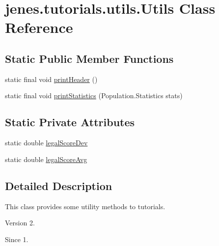 \hypertarget{classjenes_1_1tutorials_1_1utils_1_1_utils}{\section{jenes.\-tutorials.\-utils.\-Utils Class Reference}
\label{classjenes_1_1tutorials_1_1utils_1_1_utils}
}
\subsection*{Static Public Member Functions}
\begin{DoxyCompactItemize}
\item 
static final void \hyperlink{classjenes_1_1tutorials_1_1utils_1_1_utils_a69faf47422bb9677c832496aa7c3b516}{print\-Header} ()
\item 
static final void \hyperlink{classjenes_1_1tutorials_1_1utils_1_1_utils_a6bee3809d14100994dd942f3d745fa0c}{print\-Statistics} (Population.\-Statistics stats)
\end{DoxyCompactItemize}
\subsection*{Static Private Attributes}
\begin{DoxyCompactItemize}
\item 
static double \hyperlink{classjenes_1_1tutorials_1_1utils_1_1_utils_a88c455de5941ab784dee9bef8ee4d46f}{legal\-Score\-Dev}
\item 
static double \hyperlink{classjenes_1_1tutorials_1_1utils_1_1_utils_af0307ceaa2b9ca93fb3cfef7c75303a8}{legal\-Score\-Avg}
\end{DoxyCompactItemize}


\subsection{Detailed Description}
This class provides some utility methods to tutorials.

\begin{DoxyVersion}{Version}
2. 
\end{DoxyVersion}
\begin{DoxySince}{Since}
1. 
\end{DoxySince}


